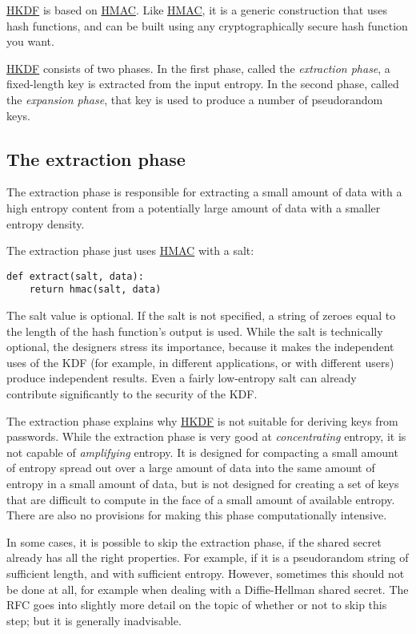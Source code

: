 \documentclass[11pt,ebook,table,dvipsnames]{memoir}
\begin{document}
\hyperref[HKDF]{HKDF} is based on \hyperref[HMAC]{HMAC}. Like \hyperref[HMAC]{HMAC}, it is a generic construction that
uses hash functions, and can be built using any cryptographically
secure hash function you want.

\hyperref[HKDF]{HKDF} consists of two phases. In the first phase, called the
\emph{extraction phase}, a fixed-length key is extracted from the input
entropy. In the second phase, called the \emph{expansion phase}, that key
is used to produce a number of pseudorandom keys.

\subsection{The extraction phase}
\label{sec-2-9-6-1}

The extraction phase is responsible for extracting a small amount of
data with a high entropy content from a potentially large amount of
data with a smaller entropy density.

The extraction phase just uses \hyperref[HMAC]{HMAC} with a salt:

\begin{verbatim}
def extract(salt, data):
    return hmac(salt, data)
\end{verbatim}

The salt value is optional. If the \gls{salt} is not specified, a
string of zeroes equal to the length of the hash function's output is
used. While the salt is technically optional, the designers stress its
importance, because it makes the independent uses of the KDF (for
example, in different applications, or with different users) produce
independent results. Even a fairly low-entropy salt can already
contribute significantly to the security of the KDF. \cite{rfc5869}
\cite{hkdf}

The extraction phase explains why \hyperref[HKDF]{HKDF} is not suitable for deriving
keys from passwords. While the extraction phase is very good at
\emph{concentrating} entropy, it is not capable of \emph{amplifying} entropy. It
is designed for compacting a small amount of entropy spread out over a
large amount of data into the same amount of entropy in a small amount
of data, but is not designed for creating a set of keys that are
difficult to compute in the face of a small amount of available
entropy. There are also no provisions for making this phase
computationally intensive. \cite{rfc5869}

In some cases, it is possible to skip the extraction phase, if the
shared secret already has all the right properties. For example, if it
is a pseudorandom string of sufficient length, and with sufficient
entropy. However, sometimes this should not be done at all, for
example when dealing with a Diffie-Hellman shared secret. The RFC goes
into slightly more detail on the topic of whether or not to skip this
step; but it is generally inadvisable. \cite{rfc5869}
\end{document}
